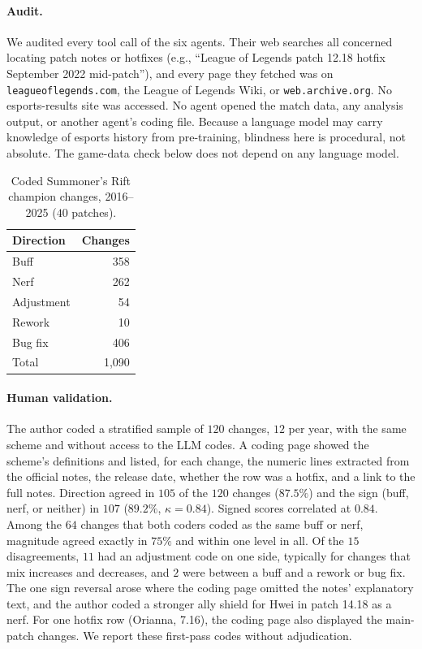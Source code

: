 \documentclass[11pt]{article}
\begin{document}
\paragraph{Audit.} We audited every tool call of the six agents. Their web searches all concerned locating patch notes or hotfixes (e.g., ``League of Legends patch 12.18 hotfix September 2022 mid-patch''), and every page they fetched was on \texttt{leagueoflegends.com}, the League of Legends Wiki, or \texttt{web.archive.org}. No esports-results site was accessed. No agent opened the match data, any analysis output, or another agent's coding file. Because a language model may carry knowledge of esports history from pre-training, blindness here is procedural, not absolute. The game-data check below does not depend on any language model.

\begin{table}[h]
\centering
\small
\caption{Coded Summoner's Rift champion changes, 2016--2025 ($40$ patches).}
\label{tab:coding}
\begin{tabular}{lr}
\toprule
Direction & Changes \\
\midrule
Buff & 358 \\
Nerf & 262 \\
Adjustment & 54 \\
Rework & 10 \\
Bug fix & 406 \\
\midrule
Total & 1{,}090 \\
\bottomrule
\end{tabular}
\end{table}

\paragraph{Human validation.} The author coded a stratified sample of $120$ changes, $12$ per year, with the same scheme and without access to the LLM codes. A coding page showed the scheme's definitions and listed, for each change, the numeric lines extracted from the official notes, the release date, whether the row was a hotfix, and a link to the full notes. Direction agreed in $105$ of the $120$ changes ($87.5\%$) and the sign (buff, nerf, or neither) in $107$ ($89.2\%$, $\kappa = 0.84$). Signed scores correlated at $0.84$. Among the $64$ changes that both coders coded as the same buff or nerf, magnitude agreed exactly in $75\%$ and within one level in all. Of the $15$ disagreements, $11$ had an adjustment code on one side, typically for changes that mix increases and decreases, and $2$ were between a buff and a rework or bug fix. The one sign reversal arose where the coding page omitted the notes' explanatory text, and the author coded a stronger ally shield for Hwei in patch 14.18 as a nerf. For one hotfix row (Orianna, 7.16), the coding page also displayed the main-patch changes. We report these first-pass codes without adjudication.
\end{document}
